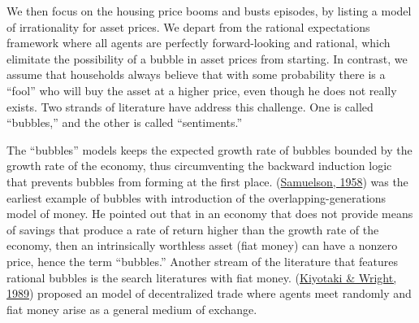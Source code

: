 \documentclass[
  12pt,
]{article}
\begin{document}
We then focus on the housing price booms and busts episodes, by listing a model of irrationality for asset prices. We depart from the rational expectations framework where all agents are perfectly forward-looking and rational, which elimitate the possibility of a bubble in asset prices from starting. In contrast, we assume that households always believe that with some probability there is a ``fool'' who will buy the asset at a higher price, even though he does not really exists. Two strands of literature have address this challenge. One is called ``bubbles,'' and the other is called ``sentiments.''

The ``bubbles'' models keeps the expected growth rate of bubbles bounded by the growth rate of the economy, thus circumventing the backward induction logic that prevents bubbles from forming at the first place. (\protect\hyperlink{ref-samuelson_exact_1958}{Samuelson, 1958}) was the earliest example of bubbles with introduction of the overlapping-generations model of money. He pointed out that in an economy that does not provide means of savings that produce a rate of return higher than the growth rate of the economy, then an intrinsically worthless asset (fiat money) can have a nonzero price, hence the term ``bubbles.'' Another stream of the literature that features rational bubbles is the search literatures with fiat money. (\protect\hyperlink{ref-kiyotaki_money_1989}{Kiyotaki \& Wright, 1989}) proposed an model of decentralized trade where agents meet randomly and fiat money arise as a general medium of exchange.
\end{document}

